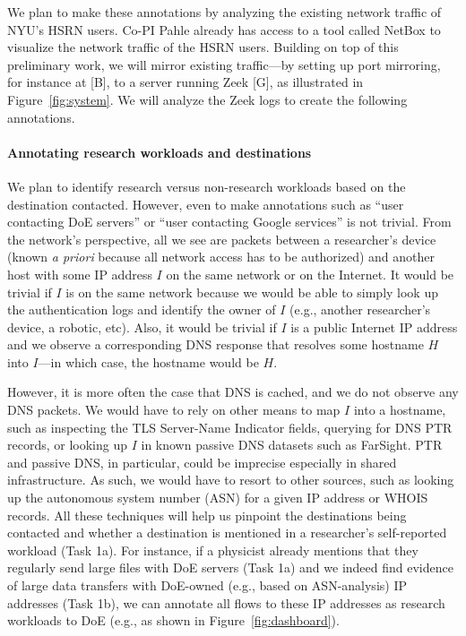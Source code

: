 We plan to make these annotations by analyzing the existing network traffic of NYU's HSRN users. Co-PI Pahle already has access to a tool called NetBox to visualize the network traffic of the HSRN users. Building on top of this preliminary work, we will mirror existing traffic---by setting up port mirroring, for instance at [B], to a server running Zeek [G], as illustrated in Figure~\ref{fig:system}. We will analyze the Zeek logs to create the following annotations.

\paragraph{Annotating research workloads and destinations}
We plan to identify research versus non-research workloads based on the destination contacted. However, even to make annotations such as ``user contacting DoE servers'' or ``user contacting Google services'' is not trivial.
From the network's perspective, all we see are packets between a researcher's device (known \textit{a priori} because all network access has to be authorized) and another host with some IP address $I$ on the same network or on the Internet. It would be trivial if $I$ is on the same network because we would be able to simply look up the authentication logs and identify the owner of $I$ (e.g., another researcher's device, a robotic, etc). Also, it would be trivial if $I$ is a public Internet IP address and we observe a corresponding DNS response that resolves some hostname $H$ into $I$---in which case, the hostname would be $H$.

However, it is more often the case that DNS is cached, and we do not observe any DNS packets. We would have to rely on other means to map $I$ into a hostname, such as inspecting the TLS Server-Name Indicator fields, querying for DNS PTR records, or looking up $I$ in known passive DNS datasets such as FarSight. PTR and passive DNS, in particular, could be imprecise especially in shared infrastructure. As such, we would have to resort to other sources, such as looking up the autonomous system number (ASN) for a given IP address or WHOIS records. All these techniques will help us pinpoint the destinations being contacted and whether a destination is mentioned in a researcher's self-reported workload (Task 1a). For instance, if a physicist already mentions that they regularly send large files with DoE servers (Task 1a) and we indeed find evidence of large data transfers with DoE-owned (e.g., based on ASN-analysis) IP addresses (Task 1b), we can annotate all flows to these IP addresses as research workloads to DoE (e.g., as shown in Figure~\ref{fig:dashboard}).



